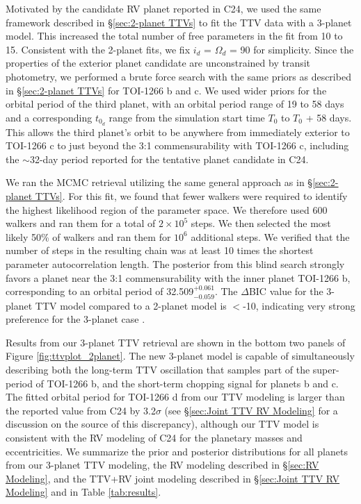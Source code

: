 \documentclass[twocolumn]{aastex631}
\begin{document}
Motivated by the candidate RV planet reported in C24, we used the same framework described in \S\ref{sec:2-planet TTVs} to fit the TTV data with a 3-planet model. This increased the total number of free parameters in the fit from 10 to 15.  Consistent with the 2-planet fits, we fix $i_d$ = $\Omega_d$ = 90 for simplicity. Since the properties of the exterior planet candidate are unconstrained by transit photometry, we performed a brute force search with the same priors as described in \S\ref{sec:2-planet TTVs} for TOI-1266 b and c. We used wider priors for the orbital period of the third planet, with an orbital period range of 19 to 58 days and a corresponding $t_{0_d}$ range from the simulation start time $T_0$ to $T_0$ + 58 days. This allows the third planet's orbit to be anywhere from immediately exterior to TOI-1266 c to just beyond the 3:1 commensurability with TOI-1266 c, including the $\sim$32-day period reported for the tentative planet candidate in C24. 

We ran the MCMC retrieval utilizing the same general approach as in \S\ref{sec:2-planet TTVs}.  For this fit, we found that fewer walkers were required to identify the highest likelihood region of the parameter space. We therefore used 600 walkers and ran them for a total of $2\times10^5$ steps.  We then selected the most likely 50\% of walkers and ran them for $10^6$ additional steps. We verified that the number of steps in the resulting chain was at least 10 times the shortest parameter autocorrelation length. The posterior from this blind search strongly favors a planet near the 3:1 commensurability with the inner planet TOI-1266 b, corresponding to an orbital period of 32.509$^{+0.061}_{-0.059}$. The $\Delta$BIC value for the 3-planet TTV model compared to a 2-planet model is $<$-10, indicating very strong preference for the 3-planet case \citep{raftery1995}.

Results from our 3-planet TTV retrieval are shown in the bottom two panels of Figure \ref{fig:ttvplot_2planet}. The new 3-planet model is capable of simultaneously describing both the long-term TTV oscillation that samples part of the super-period of TOI-1266 b, and the short-term chopping signal for planets b and c. The fitted orbital period for TOI-1266 d from our TTV modeling is larger than the reported value from C24 by 3.2$\sigma$ (see \S\ref{sec:Joint TTV RV Modeling} for a discussion on the source of this discrepancy), although our TTV model is consistent with the RV modeling of C24 for the planetary masses and eccentricities. We summarize the prior and posterior distributions for all planets from our 3-planet TTV modeling, the RV modeling described in \S\ref{sec:RV Modeling}, and the TTV+RV joint modeling described in \S\ref{sec:Joint TTV RV Modeling} and in Table \ref{tab:results}.
\end{document}
